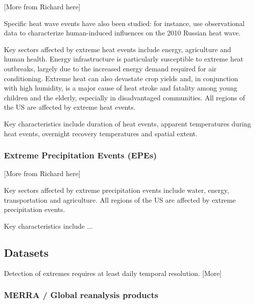 \documentclass[11pt]{article}
\begin{document}
{\color{red}[More from Richard here]}

Specific heat wave events have also been studied:  for instance, \cite{dole2011grl} use observational data to characterize human-induced influences on the 2010 Russian heat wave.  

Key sectors affected by extreme heat events include energy, agriculture and human health.  Energy infrastructure is particularly susceptible to extreme heat outbreaks, largely due to the increased energy demand required for air conditioning.  Extreme heat can also devastate crop yields and, in conjunction with high humidity, is a major cause of heat stroke and fatality among young children and the elderly, especially in disadvantaged communities.  All regions of the US are affected by extreme heat events.

Key characteristics include duration of heat events, apparent temperatures during heat events, overnight recovery temperatures and spatial extent.

\subsubsection{Extreme Precipitation Events (EPEs)}

{\color{red}[More from Richard here]}

Key sectors affected by extreme precipitation events include water, energy, transportation and agriculture.  All regions of the US are affected by extreme precipitation events.

Key characteristics include ...


\subsection{Datasets} \label{sec:Datasets}

Detection of extremes requires at least daily temporal resolution. {\color{red} [More]}

\subsubsection{MERRA / Global reanalysis products} \label{sec:MERRA}
\end{document}
